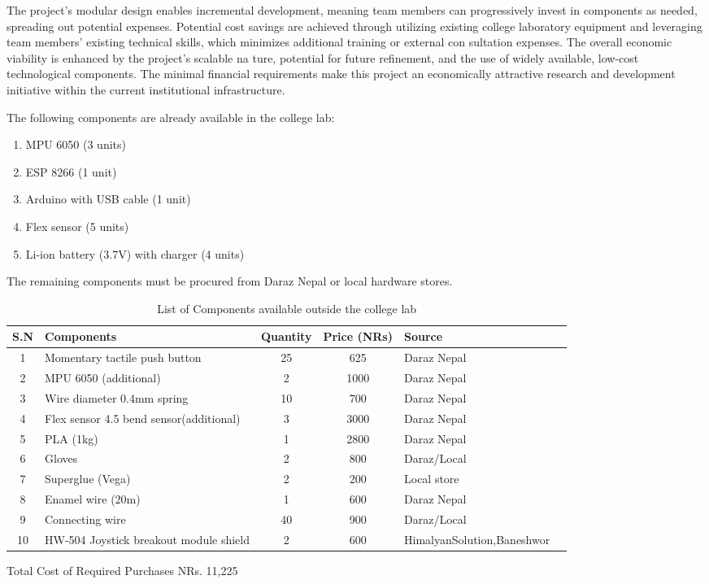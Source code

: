  The project’s modular design enables incremental development, meaning team members can
 progressively invest in components as needed, spreading out potential expenses. Potential cost savings are achieved through utilizing existing college laboratory equipment and leveraging
 team members’ existing technical skills, which minimizes additional training or external con
sultation expenses. The overall economic viability is enhanced by the project’s scalable na
ture, potential for future refinement, and the use of widely available, low-cost technological
 components. The minimal financial requirements make this project an economically attractive
 research and development initiative within the current institutional infrastructure.

 The following components are already available in the college lab:

\begin{enumerate}
\item MPU 6050 (3 units)
\item ESP 8266 (1 unit)
\item Arduino with USB cable (1 unit)
\item Flex sensor (5 units)
\item Li-ion battery (3.7V) with charger (4 units)
\end{enumerate}

The remaining components must be procured from Daraz Nepal or local hardware stores.

\begin{table}[h]
\centering
\begin{tabular}{c l c c l p{3cm}}
\toprule
\textbf{S.N} & \textbf{Components} & \textbf{Quantity} & \textbf{Price (NRs)} & \textbf{Source} &  \\
\midrule
1 & Momentary tactile push button & 25 & 625 & Daraz Nepal & \\
2 & MPU 6050 (additional) & 2 & 1000 & Daraz Nepal &  \\
3 & Wire diameter 0.4mm spring & 10 & 700 & Daraz Nepal & \\
4 & Flex sensor 4.5 bend sensor(additional) & 3 & 3000 & Daraz Nepal &  \\
5 & PLA (1kg) & 1 & 2800 & Daraz Nepal & \\
6 & Gloves & 2 & 800 & Daraz/Local & \\
7 & Superglue (Vega) & 2 & 200 & Local store & \\
8 & Enamel wire (20m) & 1 & 600 & Daraz Nepal & \\
9 & Connecting wire & 40 & 900 & Daraz/Local & \\
10 & HW-504 Joystick  breakout module shield & 2 & 600 & HimalyanSolution,Baneshwor & \\
\bottomrule
\end{tabular}
\caption{List of Components  available outside the college lab}
\end{table}
Total Cost of Required Purchases
NRs. 11,225